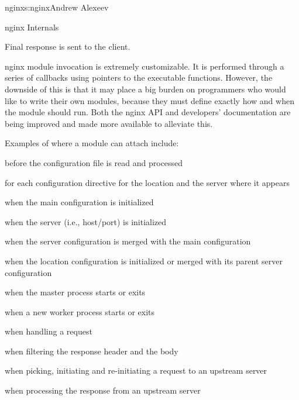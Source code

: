 \begin{aosachapter}{nginx}{s:nginx}{Andrew Alexeev}
\begin{aosasect1}{nginx Internals}
\begin{aosaenumerate}
\item Final response is sent to the client.

\end{aosaenumerate}

nginx module invocation is extremely customizable. It is performed
through a series of callbacks using pointers to the executable
functions. However, the downside of this is that it may place a big
burden on programmers who would like to write their own modules,
because they must define exactly how and when the module should
run. Both the nginx API and developers' documentation are being
improved and made more available to alleviate this.

Examples of where a module can attach include:

\begin{aosaitemize}

\item before the configuration file is read and processed

\item for each configuration directive for the location and the server
  where it appears

\item when the main configuration is initialized

\item when the server (i.e., host/port) is initialized

\item when the server configuration is merged with the main
  configuration

\item when the location configuration is initialized or merged with
  its parent server configuration

\item when the master process starts or exits

\item when a new worker process starts or exits

\item when handling a request

\item when filtering the response header and the body

\item when picking, initiating and re-initiating a request to an
  upstream server

\item when processing the response from an upstream server


\end{aosaitemize}
\end{aosasect1}
\end{aosachapter}
